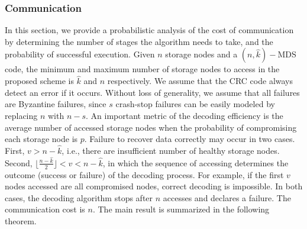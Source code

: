 \documentclass[10pt,journal,letterpaper,compsoc]{IEEEtran}
\newcommand{\0}{{\bf 0}}
\begin{document}
\subsubsection{Communication}
\label{sect:analysis}
In this section, we provide a probabilistic analysis of the cost of
communication by determining the number of stages the algorithm needs to take,
and the probability of successful execution. Given $n$ storage nodes and a
$(n,\hat{k})-$MDS code, the minimum and maximum number of storage nodes to access
in the proposed scheme is $\hat{k}$ and $n$ respectively. We assume that
the CRC code always detect an error if it occurs.  Without loss of
generality, we assume that all failures are Byzantine failures, since $s$ crash-stop
failures can be easily modeled by replacing $n$ with $n-s$. An important metric
of the decoding efficiency is the average number of accessed storage nodes when
the probability of compromising each storage node is $p$. Failure to recover
data correctly may occur in two cases. First, $v > n-\hat{k}$, i.e., there are
insufficient number of healthy storage nodes. Second,
$\lfloor\frac{n-\hat{k}}{2}\rfloor < v < n-\hat{k}$, in which the sequence of accessing
determines the outcome (success or failure) of the decoding process.  For
example, if the first $v$ nodes accessed are all compromised nodes, correct
decoding is impossible. In both cases, the decoding algorithm stops after $n$
accesses and declares a failure.  The communication cost is $n$. 
The main result is summarized in the following theorem.
\end{document}
